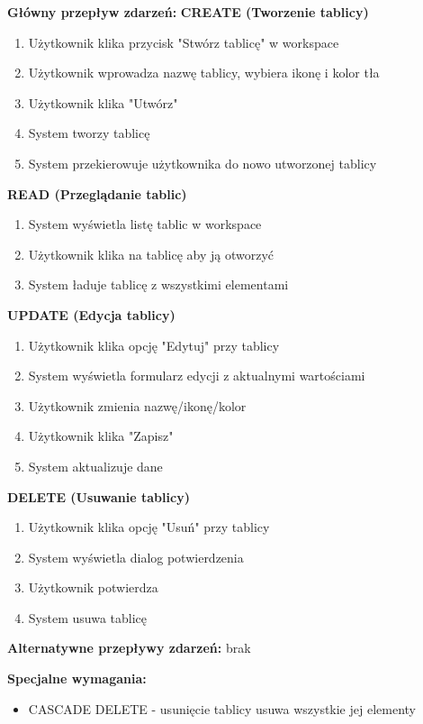 \documentclass[12pt,a4paper]{article}
\begin{document}
\textbf{Główny przepływ zdarzeń:}
\textbf{CREATE (Tworzenie tablicy)}
\begin{enumerate}[leftmargin=*]
    \item Użytkownik klika przycisk "Stwórz tablicę" w workspace
    \item Użytkownik wprowadza nazwę tablicy, wybiera ikonę i kolor tła
    \item Użytkownik klika "Utwórz"
    \item System tworzy tablicę
    \item System przekierowuje użytkownika do nowo utworzonej tablicy
\end{enumerate}
\textbf{READ (Przeglądanie tablic)}
\begin{enumerate}[leftmargin=*]
    \item System wyświetla listę tablic w workspace
    \item Użytkownik klika na tablicę aby ją otworzyć
    \item System ładuje tablicę z wszystkimi elementami
\end{enumerate}
\textbf{UPDATE (Edycja tablicy)}
\begin{enumerate}[leftmargin=*]
    \item Użytkownik klika opcję "Edytuj" przy tablicy
    \item System wyświetla formularz edycji z aktualnymi wartościami
    \item Użytkownik zmienia nazwę/ikonę/kolor
    \item Użytkownik klika "Zapisz"
    \item System aktualizuje dane
\end{enumerate}
\textbf{DELETE (Usuwanie tablicy)}
\begin{enumerate}[leftmargin=*]
    \item Użytkownik klika opcję "Usuń" przy tablicy
    \item System wyświetla dialog potwierdzenia
    \item Użytkownik potwierdza
    \item System usuwa tablicę
\end{enumerate}

\textbf{Alternatywne przepływy zdarzeń:}
brak

\textbf{Specjalne wymagania:}
\begin{itemize}
    \item CASCADE DELETE - usunięcie tablicy usuwa wszystkie jej elementy
\end{itemize}
\end{document}
